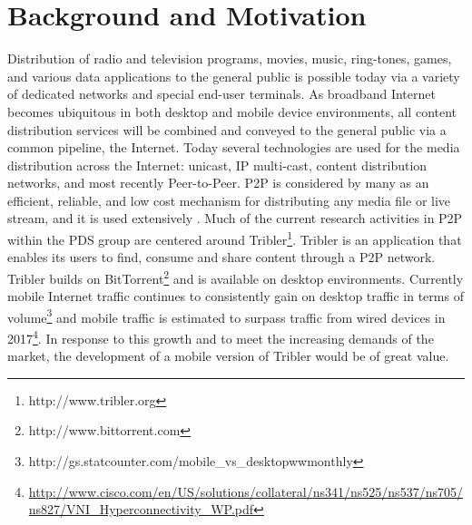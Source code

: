 \section{Background and Motivation}
Distribution of radio and television programs, movies, music, ring-tones, games, and various data applications to the general public is possible today via a variety of dedicated networks and special end-user terminals. As broadband Internet becomes ubiquitous in both desktop and mobile device environments, all content distribution services will be combined and conveyed to the general public via a common pipeline, the Internet. Today several technologies are used for the media distribution across the Internet: unicast, IP multi-cast, content distribution networks, and most recently Peer-to-Peer. P2P is considered by many as an efficient, reliable, and low cost mechanism for distributing any media file or live stream, and it is used extensively \cite{internet_study}. Much of the current research activities in P2P within the PDS group are centered around Tribler\footnote{http://www.tribler.org}. Tribler is an application that enables its users to find, consume and share content through a P2P network. Tribler builds on BitTorrent\footnote{http://www.bittorrent.com} and is available on desktop environments. Currently mobile Internet traffic continues to consistently gain on desktop traffic in terms of volume\footnote{http://gs.statcounter.com/mobile\_vs\_desktop\-ww\-monthly} and mobile traffic is estimated to surpass traffic from wired devices in 2017\footnote{\url{http://www.cisco.com/en/US/solutions/collateral/ns341/ns525/ns537/ns705/ns827/VNI\_Hyperconnectivity\_WP.pdf}}. In response to this growth and to meet the increasing demands of the market, the development of a mobile version of Tribler would be of great value. 
